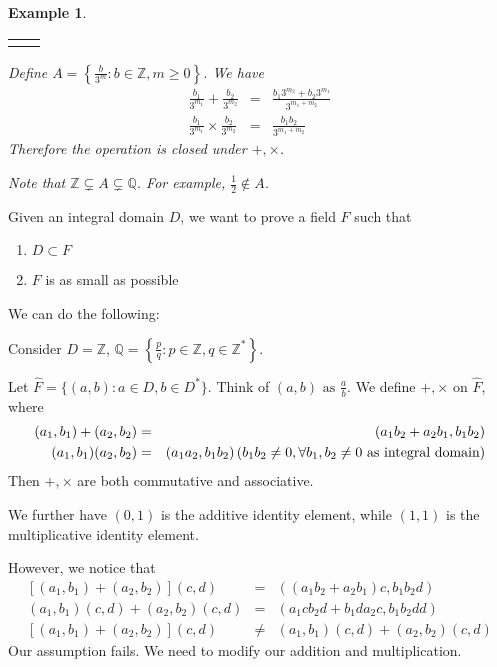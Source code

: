 \documentclass{article}
\theoremstyle{MyNonumberplain}
\theoremstyle{break}
\newcommand{\nline}{\begin{tabular}{ll}&\\\end{tabular}}
\newcommand{\nin}{\not\in}
\theoremstyle{break}
\newtheorem{example}{Example}[section]
\theoremstyle{break}
\theoremstyle{definition}
\theoremstyle{break}
\begin{document}
\begin{expbox}
    \begin{example} 

        \nline

        Define $A = \left\{ \frac{b}{3^m} : b \in \mathbb{Z}, m \geq 0 \right\}$. We
        have
        \begin{eqnarray*}
        \frac{b_1}{3^{m_1}} + \frac{b_2}{3^{m_2}} & = & \frac{b_1 3^{m_2} + b_2
        3^{m_1}}{3^{m_1 + m_2}}\\
        \frac{b_1}{3^{m_1}} \times \frac{b_2}{3^{m_2}} & = & \frac{b_1 b_2}{3^{m_1 +
        m_2}}
        \end{eqnarray*}
        Therefore the operation is closed under $+, \times$.\bigskip

        Note that $\mathbb{Z} \subsetneq A \subsetneq \mathbb{Q}$. For example,
        $\frac{1}{2} \nin A$.
    \end{example}
\end{expbox}

Given an integral domain $D$, we want to prove a field $F$ such that
\begin{enumerate}
  \item $D \subset F$
  
  \item $F$ is as small as possible
\end{enumerate}
We can do the following:

Consider $D =\mathbb{Z}$, $\mathbb{Q}= \left\{ \frac{p}{q} : p \in \mathbb{Z},
q \in \mathbb{Z}^{\ast} \right\}$.

Let $\hat{F} = \{ (a, b) : a \in D, b \in D^{\ast} \}$. Think of $(a, b)
\text{ as } \frac{a}{b}$. We define $+, \times$ on $\hat{F}$, where
\begin{eqnarray*}
  (a_1, b_1) + (a_2, b_2) & = & (a_1 b_2 + a_2 b_1, b_1 b_2)\\
  (a_1, b_1) (a_2, b_2) & = & (a_1 a_2, b_1 b_2) \hspace*{\fill} \left( b_1
  b_2 \neq 0, \forall b_1, b_2 \neq 0 \text{ as integral domain} \right)
\end{eqnarray*}
Then $+, \times$ are both commutative and associative.

We further have $(0, 1)$ is the additive identity element, while $(1, 1)$ is
the multiplicative identity element.

However, we notice that
\begin{eqnarray*}
  {}[(a_1, b_1) + (a_2, b_2)] (c, d) & = & ((a_1 b_2 + a_2 b_1) c, b_1 b_2
  d)\\
  (a_1, b_1) (c, d) + (a_2, b_2) (c, d) & = & (a_1 c b_2 d + b_1 d a_2 c, b_1
  b_2 d d)\\
  {}[(a_1, b_1) + (a_2, b_2)] (c, d) & \neq & (a_1, b_1) (c, d) + (a_2, b_2)
  (c, d)
\end{eqnarray*}
Our assumption fails. We need to modify our addition and multiplication.
\end{document}
